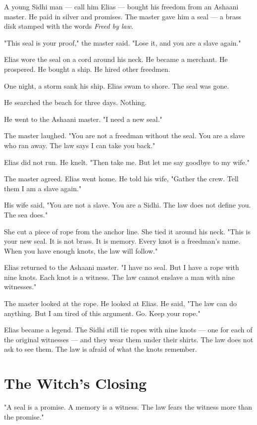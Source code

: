 \documentclass[10pt,twoside]{book}
\begin{document}
A young Sidhi man --- call him Elias --- bought his freedom from an Ashaani master. He paid in silver and promises. The master gave him a seal --- a brass disk stamped with the words \textit{Freed by law}.

"This seal is your proof," the master said. "Lose it, and you are a slave again."

Elias wore the seal on a cord around his neck. He became a merchant. He prospered. He bought a ship. He hired other freedmen.

One night, a storm sank his ship. Elias swam to shore. The seal was gone.

He searched the beach for three days. Nothing.

He went to the Ashaani master. "I need a new seal."

The master laughed. "You are not a freedman without the seal. You are a slave who ran away. The law says I can take you back."

Elias did not run. He knelt. "Then take me. But let me say goodbye to my wife."

The master agreed. Elias went home. He told his wife, "Gather the crew. Tell them I am a slave again."

His wife said, "You are not a slave. You are a Sidhi. The law does not define you. The sea does."

She cut a piece of rope from the anchor line. She tied it around his neck. "This is your new seal. It is not brass. It is memory. Every knot is a freedman's name. When you have enough knots, the law will follow."

Elias returned to the Ashaani master. "I have no seal. But I have a rope with nine knots. Each knot is a witness. The law cannot enslave a man with nine witnesses."

The master looked at the rope. He looked at Elias. He said, "The law can do anything. But I am tired of this argument. Go. Keep your rope."

Elias became a legend. The Sidhi still tie ropes with nine knots --- one for each of the original witnesses --- and they wear them under their shirts. The law does not ask to see them. The law is afraid of what the knots remember.

\section*{The Witch's Closing}
"A seal is a promise. A memory is a witness. The law fears the witness more than the promise."
\end{document}
